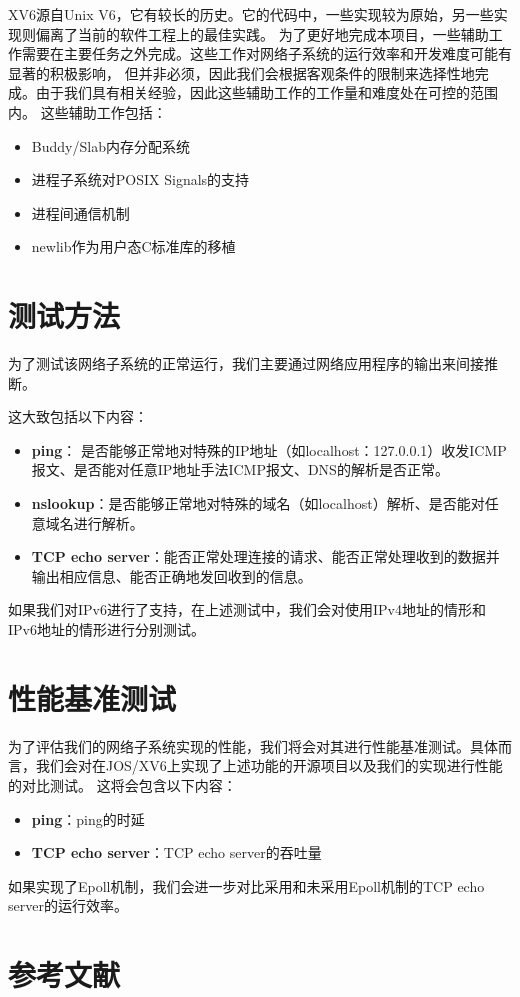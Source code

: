 \documentclass[a4paper,twoside]{article}
\begin{document}
\begin{spacing}{1.2}
XV6源自Unix V6，它有较长的历史。它的代码中，一些实现较为原始，另一些实现则偏离了当前的软件工程上的最佳实践。
为了更好地完成本项目，一些辅助工作需要在主要任务之外完成。这些工作对网络子系统的运行效率和开发难度可能有显著的积极影响，
但并非必须，因此我们会根据客观条件的限制来选择性地完成。由于我们具有相关经验，因此这些辅助工作的工作量和难度处在可控的范围内。
这些辅助工作包括：

\begin{itemize}
	\item Buddy\cite{peterson1977buddy}/Slab\cite{bonwick1994slab}内存分配系统
	\item 进程子系统对POSIX Signals的支持
	\item 进程间通信机制
	\item newlib作为用户态C标准库的移植
\end{itemize}

\section{测试方法}

为了测试该网络子系统的正常运行，我们主要通过网络应用程序的输出来间接推断。

这大致包括以下内容：

\begin{itemize}
	\item \textbf{ping}： 是否能够正常地对特殊的IP地址（如localhost：127.0.0.1）收发ICMP报文、是否能对任意IP地址手法ICMP报文、DNS的解析是否正常。
	\item \textbf{nslookup}：是否能够正常地对特殊的域名（如localhost）解析、是否能对任意域名进行解析。
	\item \textbf{TCP echo server}：能否正常处理连接的请求、能否正常处理收到的数据并输出相应信息、能否正确地发回收到的信息。
\end{itemize}

如果我们对IPv6进行了支持，在上述测试中，我们会对使用IPv4地址的情形和IPv6地址的情形进行分别测试。

\section{性能基准测试}

为了评估我们的网络子系统实现的性能，我们将会对其进行性能基准测试。具体而言，我们会对在JOS/XV6上实现了上述功能的开源项目以及我们的实现进行性能的对比测试。
这将会包含以下内容：

\begin{itemize}
	\item \textbf{ping}：ping的时延
	\item \textbf{TCP echo server}：TCP echo server的吞吐量
\end{itemize}

如果实现了Epoll机制，我们会进一步对比采用和未采用Epoll机制的TCP echo server的运行效率。

\clearpage
\section*{参考文献}





\end{spacing}
\end{document}
